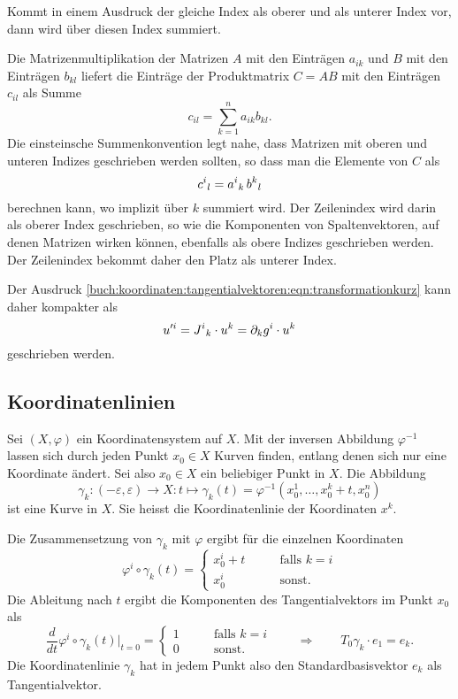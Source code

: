 \begin{definition}
Kommt in einem Ausdruck der gleiche Index als oberer und als unterer
Index vor, dann wird über diesen Index summiert.
\end{definition}

Die Matrizenmultiplikation der Matrizen $A$ mit den Einträgen $a_{ik}$ und
$B$ mit den Einträgen $b_{kl}$ liefert die Einträge der Produktmatrix
$C=AB$ mit den Einträgen $c_{il}$ als Summe
\[
c_{il}
=
\sum_{k=1}^n
a_{ik} b_{kl}.
\]
Die einsteinsche Summenkonvention legt nahe, dass Matrizen mit oberen
und unteren Indizes geschrieben werden sollten, so dass man die
Elemente von $C$ als
\[
c^i\mathstrut_l
=
a^i\mathstrut_k\,
b^k\mathstrut_l
\]
berechnen kann, wo implizit über $k$ summiert wird.
Der Zeilenindex wird darin als oberer Index geschrieben, so wie
die Komponenten von Spaltenvektoren, auf denen Matrizen wirken können, 
ebenfalls als obere Indizes geschrieben werden.
Der Zeilenindex bekommt daher den Platz als unterer Index.

Der Ausdruck
\eqref{buch:koordinaten:tangentialvektoren:eqn:transformationkurz}
kann daher kompakter als
\[
u^{\prime i}
=
J^i\mathstrut_k \cdot u^k
=
\partial_kg^i\cdot u^k
\]
geschrieben werden.

%
%
\subsection{Koordinatenlinien
\label{buch:koordinaten:tangentialvektoren:subsection:koordinatenlinien}}
Sei $(X,\varphi)$ ein Koordinatensystem auf $X$.
Mit der inversen Abbildung $\varphi^{-1}$ lassen sich durch jeden Punkt
$x_0\in X$ Kurven finden, entlang denen sich nur eine Koordinate
ändert.
Sei also $x_0\in X$ ein beliebiger Punkt in $X$.
Die Abbildung
\[
\gamma_k
\colon
(-\varepsilon,\varepsilon)
\to
X
:
t
\mapsto
\gamma_k(t)
=
\varphi^{-1}(x_0^1,\dots,x_0^k+t,x_0^n)
\]
ist eine Kurve in $X$.
Sie heisst die Koordinatenlinie der Koordinaten $x^k$.

Die Zusammensetzung von $\gamma_k$ mit $\varphi$ ergibt für die
einzelnen Koordinaten
\[
\varphi^i\circ\gamma_k(t)
=
\begin{cases}
x_0^i+t&\qquad\text{falls $k=i$} \\
x_0^i  &\qquad\text{sonst}.
\end{cases}
\]
Die Ableitung nach $t$ ergibt die Komponenten des Tangentialvektors im
Punkt $x_0$ als
\[
\frac{d}{dt}\varphi^i\circ\gamma_k(t)
\bigg|_{t=0}
=
\begin{cases}
1&\qquad \text{falls $k=i$}\\
0&\qquad\text{sonst.}
\end{cases}
\qquad\Rightarrow\qquad
T_0\gamma_k \cdot e_1 = e_k.
\]
Die Koordinatenlinie $\gamma_k$ hat in jedem Punkt also den
Standardbasisvektor $e_k$ als Tangentialvektor.
